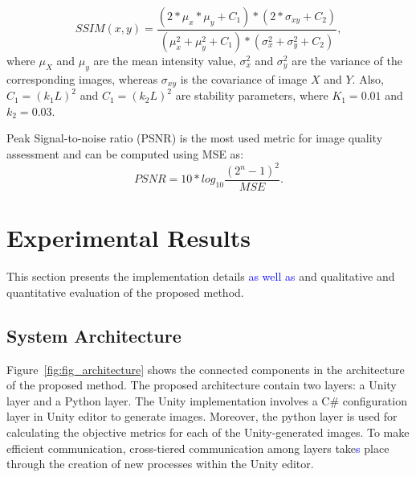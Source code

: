 \documentclass[10pt,conference]{IEEEtran}
\begin{document}
\begin{equation}
SSIM(x,y)=\frac{(2*\mu_x*\mu_y+C_1)*(2*\sigma_{xy}+C_2)}{(\mu^2_x+\mu^2_y+C_1)*(\sigma^2_x+\sigma^2_y+C_2)},
\label{eq:ssim}
\end{equation}
where $\mu_X$ and $\mu_y$ are the mean intensity value, $\sigma^2_x$ and $\sigma^2_y$ are the variance of the corresponding images, whereas $\sigma_{xy}$ is the covariance of image $X$ and $Y$. Also, $C_1=(k_1L)^2$ and $C_1=(k_2L)^2$ are stability parameters, where $K_1=0.01$ and $k_2=0.03$. \par
Peak Signal-to-noise ratio (PSNR) is the most used metric for image quality assessment and can be computed using MSE as:
\begin{equation}
PSNR = 10*log_{10}{\frac{(2^n-1)^2}{MSE}}.
\label{eq:psnr}
\end{equation}
\section{Experimental Results} \label{sec:experiments}
This section presents the implementation details \textcolor{blue}{as well as} and qualitative and quantitative evaluation of the proposed method.

\subsection{System Architecture}

Figure~\ref{fig:fig_architecture} shows the connected components in the architecture of the proposed method. The proposed architecture contain two layers: a Unity layer and a Python layer. The Unity implementation involves a C$\#$ configuration layer in Unity editor to generate images. Moreover, the python layer is used for calculating the objective metrics for each of the Unity-generated images. To make efficient communication, cross-tiered communication among layers take\textcolor{blue}{s} place through the creation of new processes within the Unity editor.
\end{document}
